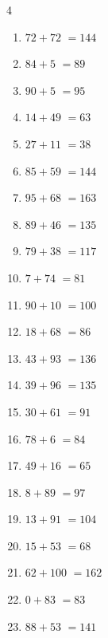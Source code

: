 \begin{multicols}{4}
\begin{enumerate}
  \item $72+72$
        $=144$

  \item $84+5$
        $=89$

  \item $90+5$
        $=95$

  \item $14+49$
        $=63$

  \item $27+11$
        $=38$

  \item $85+59$
        $=144$

  \item $95+68$
        $=163$

  \item $89+46$
        $=135$

  \item $79+38$
        $=117$

  \item $7+74$
        $=81$

  \item $90+10$
        $=100$

  \item $18+68$
        $=86$

  \item $43+93$
        $=136$

  \item $39+96$
        $=135$

  \item $30+61$
        $=91$

  \item $78+6$
        $=84$

  \item $49+16$
        $=65$

  \item $8+89$
        $=97$

  \item $13+91$
        $=104$

  \item $15+53$
        $=68$

  \item $62+100$
        $=162$

  \item $0+83$
        $=83$

\columnbreak %

  \item $88+53$
        $=141$


\end{enumerate}
\end{multicols}

